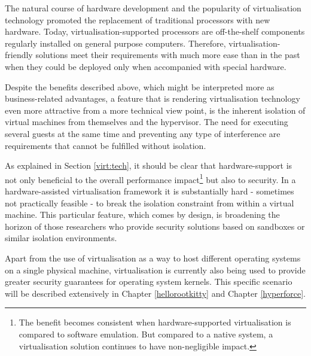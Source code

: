 The natural course of hardware development and the popularity of virtualisation technology promoted the replacement of traditional processors with new hardware. Today, virtualisation-supported processors are off-the-shelf components regularly installed on general purpose computers. Therefore, virtualisation-friendly solutions meet their requirements with much more ease than in the past when they could be deployed only when accompanied with special hardware.


Despite the benefits described above, which might be interpreted more as business-related advantages, a feature that is rendering virtualisation technology even more attractive from a more technical view point, is the inherent isolation of virtual machines from themselves and the hypervisor. The need for executing several guests at the same time and preventing any type of interference are requirements that cannot be fulfilled without isolation.

As explained in Section \ref{virt:tech}, it should be clear that hardware-support is not only beneficial to the overall performance impact\footnote{The benefit becomes consistent when hardware-supported virtualisation is compared to software emulation. But compared to a native system, a virtualisation solution continues to have non-negligible impact.} but also to security. In a hardware-assisted virtualisation framework it is substantially hard - sometimes not practically feasible - to break the isolation constraint from within a virtual machine. 
This particular feature, which comes by design, is broadening the horizon of those researchers who provide security solutions based on sandboxes or similar isolation environments.%
 

Apart from the use of virtualisation as a way to host different operating systems on a single physical machine, virtualisation is currently also being used to provide greater security guarantees for operating system kernels.
This specific scenario will be described extensively in Chapter \ref{hellorootkitty} and Chapter \ref{hyperforce}.

